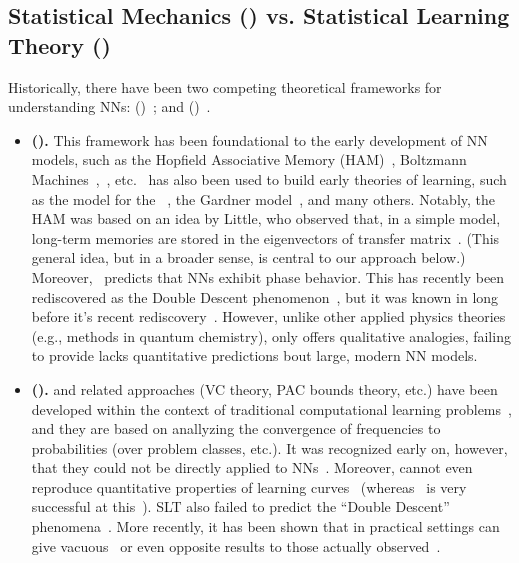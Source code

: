 \subsection{Statistical Mechanics (\STATMECH) vs. Statistical Learning Theory (\SLT)}

Historically, there have been two competing theoretical frameworks for understanding NNs:
\emph{\StatisticalMechanics} (\STATMECH)~\cite{Eng01, EB01_BOOK, Gardner_1988,SST90, SST92, LTS90, Solla2023}; and 
\emph{\StatisticalLearningTheory} (\SLT)~\cite{Vapnik98}. 
\begin{itemize}
\item
\textbf{\StatisticalMechanics (\STATMECH).}
This framework has been foundational to the early development of NN models, such as the Hopfield Associative Memory (HAM)~\cite{Hop82}, Boltzmann Machines~\cite{AHS85},~\cite{HinSej86_relearn}, etc.
\STATMECH~has also been used to build early theories of learning, such as the \StudentTeacher model for the \Perceptron \GeneralizationError~\cite{Eng01,EB01_BOOK}, the Gardner model~\cite{Gardner_1988}, and many others.
Notably, the HAM was based on an idea by Little, who observed that, in a simple model, long-term memories are stored in the eigenvectors of transfer matrix~\cite{Lit74}.
(This general idea, but in a broader sense, is central to our approach below.)
Moreover, \STATMECH~predicts that NNs exhibit phase behavior.
This has recently been rediscovered as the Double Descent phenomenon~\cite{BHMM19,loog2020}, but it was known in \STATMECH long before it's recent rediscovery~\cite{Opper01}.
However, unlike other applied physics theories (e.g., \SemiEmpirical methods in quantum chemistry), \STATMECH only offers qualitative analogies, failing to provide lacks quantitative predictions
bout large, modern NN models.\cite{roberts2022principles}
\item
\textbf{\StatisticalLearningTheory (\SLT).}
\SLT and related approaches (VC theory, PAC bounds theory, etc.) have been developed within the context of traditional computational learning problems~\cite{xxx-vapnik-book}, and 
they are based on anallyzing the convergence of frequencies to probabilities (over problem classes, etc.).
It was recognized early on, however, that they could not be directly applied to NNs~\cite{VLL94}.
Moreover, \SLT cannot even reproduce quantitative properties of learning curves~\cite{WRB93,DKST96} (whereas \STATMECH~is very successful at this~\cite{SST92}).
SLT also failed to predict the ``Double Descent'' phenomena~\cite{BHMM19}.
More recently, it has been shown that in practical settings
\SLT can give vacuous~\cite{DR17_nonvacuous_TR} or even opposite results
to those actually observed~\cite{MM21a_simpsons_TR}.
\end{itemize}

